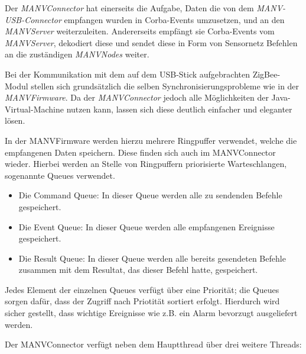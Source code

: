 Der \emph{MANVConnector} hat einerseits die Aufgabe, Daten die von dem \emph{MANV-USB-Connector} empfangen wurden in Corba-Events 
umzusetzen, und an den \emph{MANVServer} weiterzuleiten. Andererseits empfängt sie Corba-Events vom \emph{MANVServer}, dekodiert
diese und sendet diese in Form von Sensornetz Befehlen an die zuständigen \emph{MANVNodes} weiter.

Bei der Kommunikation mit dem auf dem USB-Stick aufgebrachten ZigBee-Modul stellen sich grundsätzlich die selben 
Synchronisierungsprobleme wie in der \emph{MANVFirmware}. Da der \emph{MANVConnector} jedoch alle Möglichkeiten der Java-Virtual-Machine
nutzen kann, lassen sich diese deutlich einfacher und eleganter lösen. 

In der MANVFirmware werden hierzu mehrere Ringpuffer verwendet, welche die empfangenen Daten speichern. Diese finden sich auch
im MANVConnector wieder. Hierbei werden an Stelle von Ringpuffern priorisierte Warteschlangen, sogenannte Queues verwendet. 

\begin{itemize}
    \item{Die Command Queue:} In dieser Queue werden alle zu sendenden Befehle gespeichert.
    \item{Die Event Queue:} In dieser Queue werden alle empfangenen Ereignisse gespeichert.
    \item{Die Result Queue:} In dieser Queue werden alle bereits gesendeten Befehle zusammen mit dem
                             Resultat, das dieser Befehl hatte, gespeichert.
\end{itemize}

Jedes Element der einzelnen Queues verfügt über eine Priorität; die Queues sorgen dafür, dass der
Zugriff nach Priotität sortiert erfolgt. Hierdurch wird sicher gestellt, dass wichtige Ereignisse
wie z.B. ein Alarm bevorzugt ausgeliefert werden.

Der MANVConnector verfügt neben dem Hauptthread über drei weitere Threads:

